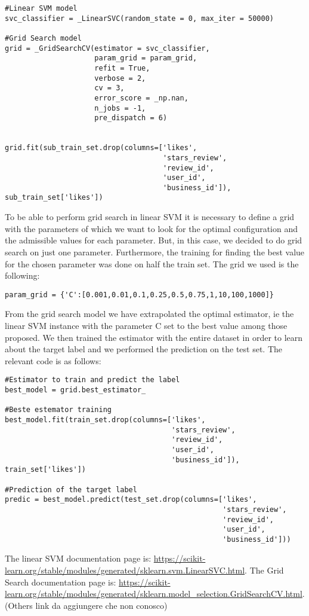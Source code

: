\begin{lstlisting}
#Linear SVM model
svc_classifier = _LinearSVC(random_state = 0, max_iter = 50000)

#Grid Search model
grid = _GridSearchCV(estimator = svc_classifier, 
                     param_grid = param_grid, 
                     refit = True, 
                     verbose = 2, 
                     cv = 3, 
                     error_score = _np.nan, 
                     n_jobs = -1, 
                     pre_dispatch = 6)

                   
grid.fit(sub_train_set.drop(columns=['likes', 
                                     'stars_review', 
                                     'review_id', 
                                     'user_id', 
                                     'business_id']), sub_train_set['likes'])                     
\end{lstlisting} 
To be able to perform grid search in linear SVM it is necessary to define a grid with the parameters of which we want to look for the optimal configuration and the admissible values for each parameter. But, in this case, we decided to do grid search on just one parameter. Furthermore, the training for finding the best value for the chosen parameter was done on half the train set. The grid we used is the following:

\begin{lstlisting}
param_grid = {'C':[0.001,0.01,0.1,0.25,0.5,0.75,1,10,100,1000]}
\end{lstlisting}
From the grid search model we have extrapolated the optimal estimator, ie the linear SVM instance with the parameter C set to the best value among those proposed. We then trained the estimator with the entire dataset in order to learn about the target label and we performed the prediction on the test set. The relevant code is as follows:

\begin{lstlisting}
#Estimator to train and predict the label
best_model = grid.best_estimator_

#Beste estemator training
best_model.fit(train_set.drop(columns=['likes', 
                                       'stars_review', 
                                       'review_id', 
                                       'user_id', 
                                       'business_id']), train_set['likes'])

#Prediction of the target label                                       
predic = best_model.predict(test_set.drop(columns=['likes', 
                                                   'stars_review', 
                                                   'review_id', 
                                                   'user_id', 
                                                   'business_id']))
\end{lstlisting}
The linear  SVM documentation page is: \url{https://scikit-learn.org/stable/modules/generated/sklearn.svm.LinearSVC.html}. The Grid Search documentation page is: \url{https://scikit-learn.org/stable/modules/generated/sklearn.model_selection.GridSearchCV.html}.\\
(Others link da aggiungere che non conosco)  




